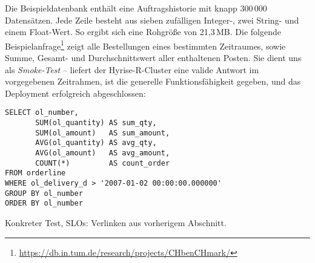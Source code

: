 Die Beispieldatenbank enthält eine Auftragshistorie mit knapp 300\,000 Datensätzen. Jede Zeile besteht aus sieben zufälligen Integer-, zwei String- und einem Float-Wert. So ergibt sich eine Rohgröße von 21,3\,MB. Die folgende Beispielanfrage\footnote{\url{https://db.in.tum.de/research/projects/CHbenCHmark/}} zeigt alle Bestellungen eines bestimmten Zeitraumes, sowie Summe, Gesamt- und Durchschnittswert aller enthaltenen Posten. Sie dient uns als \emph{Smoke-Test} -- liefert der Hyrise-R-Cluster eine valide Antwort im vorgegebenen Zeitrahmen, ist die generelle Funktionsfähigkeit gegeben, und das Deployment erfolgreich abgeschlossen:

\begin{verbatim}
SELECT ol_number,
       SUM(ol_quantity) AS sum_qty,
       SUM(ol_amount)   AS sum_amount,
       AVG(ol_quantity) AS avg_qty,
       AVG(ol_amount)   AS avg_amount,
       COUNT(*)         AS count_order
FROM orderline 
WHERE ol_delivery_d > '2007-01-02 00:00:00.000000' 
GROUP BY ol_number
ORDER BY ol_number
\end{verbatim}

Konkreter Test, SLOs: Verlinken aus vorherigem Abschnitt. 